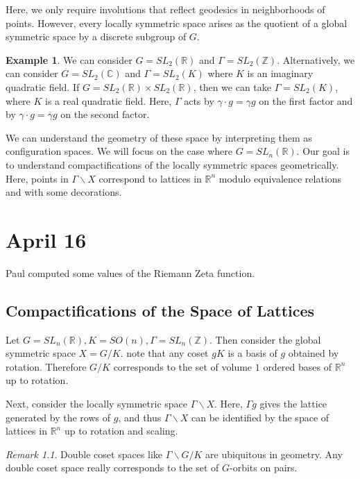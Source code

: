 \documentclass[leqno, openany]{memoir}
\theoremstyle{definition}
\newtheorem{exm}[thm]{Example}
\theoremstyle{remark}
\newtheorem{rmk}[thm]{Remark}
\theoremstyle{plain}
\theoremstyle{definition}
\theoremstyle{remark}
\newcommand{\R}{\mathbb{R}}
\renewcommand{\C}{\mathbb{C}}
\newcommand{\Z}{\mathbb{Z}}
\begin{document}
Here, we only require involutions that reflect geodesics in neighborhoods of points. However, every locally symmetric space arises as the quotient of a global symmetric space by a discrete subgroup of $G$.

\begin{exm}
    We can consider $G = SL_2(\R)$ and $\Gamma = SL_2(\Z)$. Alternatively, we can consider $G = SL_2(\C)$ and $\Gamma = SL_2(K)$ where $K$ is an imaginary quadratic field. If $G = SL_2(\R) \times SL_2(\R)$, then we can take $\Gamma = SL_2(K)$, where $K$ is a real quadratic field. Here, $\Gamma$ acts by $\gamma \cdot g = \gamma g$ on the first factor and by $\gamma \cdot g = \overline{\gamma} g$ on the second factor.
\end{exm}

We can understand the geometry of these space by interpreting them as configuration spaces. We will focus on the case where $G = SL_n(\R)$. Our goal is to understand compactifications of the locally symmetric spaces geometrically. Here, points in $\Gamma \backslash X$ correspond to lattices in $\R^n$ modulo equivalence relations and with some decorations.

\chapter{April 16}%
\label{cha:april_16}

Paul computed some values of the Riemann Zeta function.

\section{Compactifications of the Space of Lattices}%
\label{sec:compactifications_of_the_space_of_lattices}

Let $G = SL_n(\R), K = SO(n), \Gamma = SL_n(\Z)$. Then consider the global symmetric space $X = G/K$. note that any coset $gK$ is a basis of $g$ obtained by rotation. Therefore $G/K$ corresponds to the set of volume $1$ ordered bases of $\R^n$ up to rotation. 

Next, consider the locally symmetric space $\Gamma \backslash X$. Here, $\Gamma g$ gives the lattice generated by the rows of $g$, and thus $\Gamma \backslash X$ can be identified by the space of lattices in $\R^n$ up to rotation and scaling.

\begin{rmk}
    Double coset spaces like $\Gamma \backslash G / K$ are ubiquitous in geometry. Any double coset space really corresponds to the set of $G$-orbits on pairs.
\end{rmk}
\end{document}
